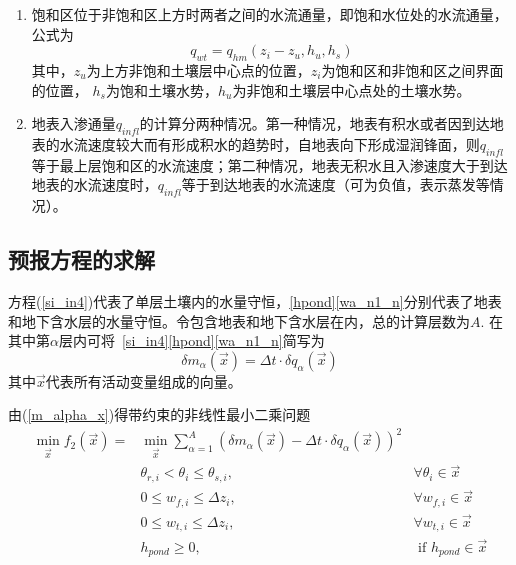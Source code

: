 \begin{enumerate}
    \item 饱和区位于非饱和区上方时两者之间的水流通量，即饱和水位处的水流通量，公式为
    \begin{equation}
    q_{wt}=q_{h m}\left(z_{i}-z_{u}, h_{u}, h_{s}\right)
    \end{equation}
    其中，$z_u$为上方非饱和土壤层中心点的位置，$z_i$为饱和区和非饱和区之间界面的位置，
    $h_s$为饱和土壤水势，$h_u$为非饱和土壤层中心点处的土壤水势。

    \item 地表入渗通量$q_{infl}$的计算分两种情况。第一种情况，地表有积水或者因到达地表的水流速度较大而有形成积水的趋势时，自地表向下形成湿润锋面，则$q_{infl}$等于最上层饱和区的水流速度；第二种情况，地表无积水且入渗速度大于到达地表的水流速度时，$q_{infl}$等于到达地表的水流速度（可为负值，表示蒸发等情况）。
    
\end{enumerate}


\subsection{预报方程的求解}
方程(\ref{si_in4})代表了单层土壤内的水量守恒，\eqref{hpond}\eqref{wa_n1_n}分别代表了地表和地下含水层的水量守恒。令包含地表和地下含水层在内，总的计算层数为$A$. 在其中第$\alpha$层内可将~\eqref{si_in4}\eqref{hpond}\eqref{wa_n1_n}简写为
\begin{equation}\label{m_alpha_x}
\delta m_{\alpha}(\vec{x})=\Delta t \cdot \delta q_{\alpha}(\vec{x})
\end{equation}
其中$\vec{x}$代表所有活动变量组成的向量。

由(\ref{m_alpha_x})得带约束的非线性最小二乘问题
\begin{equation}\label{richards_nls}
\begin{aligned}
\min _{\vec{x}} f_{2}(\vec{x})=& \min _{\vec{x}} \sum_{\alpha=1}^{A}\left(\delta m_{\alpha}(\vec{x})-\Delta t \cdot \delta q_{\alpha}(\vec{x})\right)^{2} \\ 
& \theta_{r, i}<\theta_{i} \leqslant \theta_{s, i}, & \forall \theta_{i} \in \vec{x} \\ 
& 0 \leqslant w_{f, i} \leqslant \Delta z_{i},               & \forall w_{f, i} \in \vec{x} \\ 
& 0 \leqslant w_{t, i} \leqslant \Delta z_{i},               & \forall w_{t, i} \in \vec{x} \\ 
& h_{ {pond }} \geqslant 0,                               & \text{ if } h_{ {pond }} \in \vec{x} 
\end{aligned}
\end{equation}

